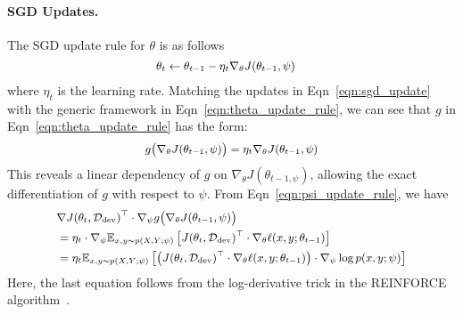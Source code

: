 \paragraph{SGD Updates.} The SGD update rule for $\theta$ is as follows
\begin{equation}
  \label{eqn:sgd_update}
   \small
  \begin{aligned}
    \theta_t &\leftarrow \theta_{t-1} - \eta_t \nabla_\theta J(\theta_{t-1}, \psi)
  \end{aligned}
\end{equation}
where $\eta_t$ is the learning rate. Matching the updates in Eqn~\ref{eqn:sgd_update} with the generic framework in Eqn~\ref{eqn:theta_update_rule}, we can see that $g$ in Eqn~\ref{eqn:theta_update_rule} has the form: %
\begin{equation}
  \label{eqn:momentum_update_g}
   \small
  \begin{aligned}
    g\big(\nabla_\theta J(\theta_{t-1}, \psi)\big) = \eta_t \nabla_\theta J(\theta_{t-1}, \psi)
  \end{aligned}
\end{equation}
This reveals a linear dependency of $g$ on $\nabla_\theta J(\theta_{t-1, \psi})$, allowing the exact differentiation of $g$ with respect to $\psi$. From Eqn~\ref{eqn:psi_update_rule}, we have
\begin{equation}
  \label{eqn:momentum_update_for_psi}
   \small
  \begin{aligned}
    &\nabla J(\theta_t, \mathcal{D}_\text{dev})^\top \cdot \nabla_\psi g\big( \nabla_\theta J(\theta_{t-1}, \psi) \big) \\
    &= \eta_t \cdot \nabla_\psi \mathbb{E}_{x, y \sim p(X, Y; \psi)} \left[J(\theta_t, \mathcal{D}_\text{dev})^\top \cdot \nabla_\theta \ell(x, y; \theta_{t-1} )\right] \\
    &= \eta_t \mathbb{E}_{x, y \sim p(X, Y; \psi)} \left[\left( J(\theta_t, \mathcal{D}_\text{dev})^\top \cdot \nabla_\theta \ell(x, y; \theta_{t-1} ) \right) \cdot \nabla_\psi \log{p(x, y; \psi)} \right]
  \end{aligned}
\end{equation}
Here, the last equation follows from the log-derivative trick in the REINFORCE algorithm~\citep{reinforce}. 

